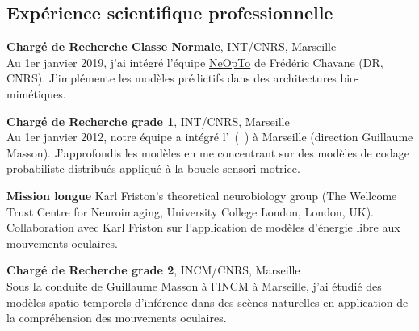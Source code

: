 \subsection{Expérience scientifique professionnelle}
\vspace*{.1cm}

	\textbf{Chargé de Recherche Classe Normale}, INT/CNRS, Marseille   \\
	 Au 1er janvier 2019, j'ai intégré l'équipe \href{http://www.int.univ-amu.fr/spip.php?page=equipe&equipe=NeOpTo&lang=en}{NeOpTo} de Frédéric Chavane (DR, CNRS). J'implémente les modèles prédictifs dans des architectures bio-mimétiques.  


	\textbf{Chargé de Recherche grade 1}, INT/CNRS, Marseille   \\
	 Au 1er janvier 2012, notre équipe a intégré l'\Institute\ (\InstituteUMR\ ) à  Marseille (direction Guillaume Masson). J'approfondis les modèles en me concentrant sur des modèles de codage probabiliste distribués appliqué à la boucle sensori-motrice.  


\textbf{Mission longue}   Karl Friston's theoretical neurobiology group (The Wellcome Trust Centre for Neuroimaging, University College London, London, UK). Collaboration avec Karl Friston sur l'application de modèles d'énergie libre aux mouvements oculaires. 

	\textbf{Chargé de Recherche grade 2}, INCM/CNRS, Marseille   \\
	 Sous la conduite de Guillaume Masson à  l'INCM à  Marseille, j'ai étudié des modèles spatio-temporels d'inférence dans des scènes naturelles en application de la compréhension des mouvements oculaires. 

